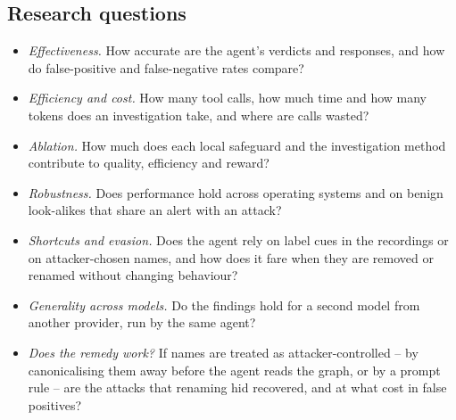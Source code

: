 \subsection{Research questions}
\begin{itemize}
\item[\textbf{RQ1}] \emph{Effectiveness.} How accurate are the agent's verdicts and responses, and how do
false-positive and false-negative rates compare?
\item[\textbf{RQ2}] \emph{Efficiency and cost.} How many tool calls, how much time and how many tokens does an
investigation take, and where are calls wasted?
\item[\textbf{RQ3}] \emph{Ablation.} How much does each local safeguard and the investigation method
contribute to quality, efficiency and reward?
\item[\textbf{RQ4}] \emph{Robustness.} Does performance hold across operating systems and on benign
look-alikes that share an alert with an attack?
\item[\textbf{RQ5}] \emph{Shortcuts and evasion.} Does the agent rely on label cues in the recordings or on
attacker-chosen names, and how does it fare when they are removed or renamed without changing behaviour?
\item[\textbf{RQ6}] \emph{Generality across models.} Do the findings hold for a second model from another
provider, run by the same agent?
\item[\textbf{RQ7}] \emph{Does the remedy work?} If names are treated as attacker-controlled -- by
canonicalising them away before the agent reads the graph, or by a prompt rule -- are the attacks that renaming
hid recovered, and at what cost in false positives?
\end{itemize}

